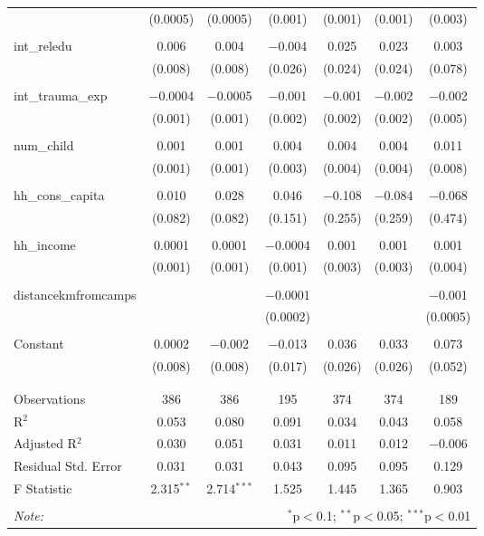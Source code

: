 \begin{table}[H]
\begin{tabular}{@{\extracolsep{4pt}}lcccccc}
  & (0.0005) & (0.0005) & (0.001) & (0.001) & (0.001) & (0.003) \\ 
  & & & & & & \\ 
 int\_reledu & 0.006 & 0.004 & $-$0.004 & 0.025 & 0.023 & 0.003 \\ 
  & (0.008) & (0.008) & (0.026) & (0.024) & (0.024) & (0.078) \\ 
  & & & & & & \\ 
 int\_trauma\_exp & $-$0.0004 & $-$0.0005 & $-$0.001 & $-$0.001 & $-$0.002 & $-$0.002 \\ 
  & (0.001) & (0.001) & (0.002) & (0.002) & (0.002) & (0.005) \\ 
  & & & & & & \\ 
 num\_child & 0.001 & 0.001 & 0.004 & 0.004 & 0.004 & 0.011 \\ 
  & (0.001) & (0.001) & (0.003) & (0.004) & (0.004) & (0.008) \\ 
  & & & & & & \\ 
 hh\_cons\_capita & 0.010 & 0.028 & 0.046 & $-$0.108 & $-$0.084 & $-$0.068 \\ 
  & (0.082) & (0.082) & (0.151) & (0.255) & (0.259) & (0.474) \\ 
  & & & & & & \\ 
 hh\_income & 0.0001 & 0.0001 & $-$0.0004 & 0.001 & 0.001 & 0.001 \\ 
  & (0.001) & (0.001) & (0.001) & (0.003) & (0.003) & (0.004) \\ 
  & & & & & & \\ 
 distancekmfromcamps &  &  & $-$0.0001 &  &  & $-$0.001 \\ 
  &  &  & (0.0002) &  &  & (0.0005) \\ 
  & & & & & & \\ 
 Constant & 0.0002 & $-$0.002 & $-$0.013 & 0.036 & 0.033 & 0.073 \\ 
  & (0.008) & (0.008) & (0.017) & (0.026) & (0.026) & (0.052) \\ 
  & & & & & & \\ 
\hline \\[-1.8ex] 
Observations & 386 & 386 & 195 & 374 & 374 & 189 \\ 
R$^{2}$ & 0.053 & 0.080 & 0.091 & 0.034 & 0.043 & 0.058 \\ 
Adjusted R$^{2}$ & 0.030 & 0.051 & 0.031 & 0.011 & 0.012 & $-$0.006 \\ 
Residual Std. Error & 0.031 & 0.031 & 0.043 & 0.095 & 0.095 & 0.129 \\ 
F Statistic & 2.315$^{**}$ & 2.714$^{***}$ & 1.525 & 1.445 & 1.365 & 0.903 \\ 
\hline 
\hline \\[-1.8ex] 
\textit{Note:}  & \multicolumn{6}{r}{$^{*}$p$<$0.1; $^{**}$p$<$0.05; $^{***}$p$<$0.01} \\ 
\end{tabular} 
\end{table} 
